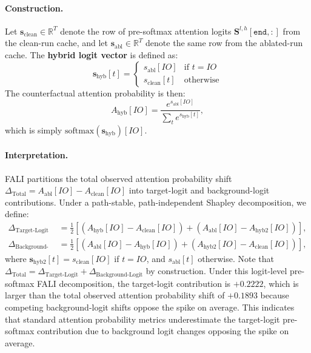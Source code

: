 \documentclass[12pt,a4paper]{article}
\begin{document}
\paragraph{Construction.} Let $\mathbf{s}_\text{clean} \in \mathbb{R}^T$
denote the row of pre-softmax attention logits
$\mathbf{S}^{l,h}[\texttt{end}, :]$ from the clean-run cache, and let
$\mathbf{s}_\text{abl} \in \mathbb{R}^T$ denote the same row from the
ablated-run cache. The \textbf{hybrid logit vector} is defined as:
\begin{equation}
  \mathbf{s}_\text{hyb}[t] =
  \begin{cases}
    s_\text{abl}[IO] & \text{if } t = IO \\
    s_\text{clean}[t] & \text{otherwise}
  \end{cases}
  \label{eq:hybrid}
\end{equation}
The counterfactual attention probability is then:
\begin{equation}
  A_\text{hyb}[IO] = \frac{e^{s_\text{abl}[IO]}}{\sum_{t} e^{s_\text{hyb}[t]}},
  \label{eq:hybridattn}
\end{equation}
which is simply $\text{softmax}(\mathbf{s}_\text{hyb})[IO]$.\paragraph{Interpretation.} FALI partitions the total observed attention probability shift
$\Delta_\text{Total} = A_\text{abl}[IO] - A_\text{clean}[IO]$ into target-logit and background-logit contributions. Under a path-stable, path-independent Shapley decomposition, we define:
\begin{align}
  \Delta_\text{Target-Logit} &= \frac{1}{2} \left[ \left( A_\text{hyb}[IO] - A_\text{clean}[IO] \right) + \left( A_\text{abl}[IO] - A_\text{hyb2}[IO] \right) \right], \label{eq:target_logit_contrib} \\
  \Delta_\text{Background-Logit} &= \frac{1}{2} \left[ \left( A_\text{abl}[IO] - A_\text{hyb}[IO] \right) + \left( A_\text{hyb2}[IO] - A_\text{clean}[IO] \right) \right],
  \label{eq:background_logit_contrib}
\end{align}
where $\mathbf{s}_\text{hyb2}[t] = s_\text{clean}[IO]$ if $t = IO$, and $s_\text{abl}[t]$ otherwise. Note that $\Delta_\text{Total} = \Delta_\text{Target-Logit} + \Delta_\text{Background-Logit}$ by construction. Under this logit-level pre-softmax FALI decomposition, the target-logit contribution is $+0.2222$, which is larger than the total observed attention probability shift of $+0.1893$ because competing background-logit shifts oppose the spike on average. This indicates that standard attention probability metrics underestimate the target-logit pre-softmax contribution due to background logit changes opposing the spike on average.
\end{document}
